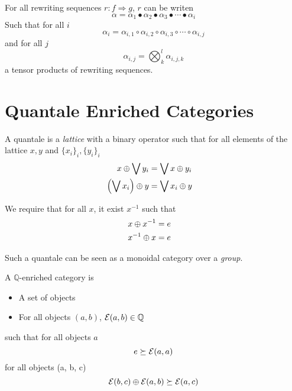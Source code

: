 \documentclass[a4paper]{article}
\begin{document}
\begin{corollary}
For all rewriting sequences $r: f \Rightarrow g$, $r$ can be writen
\[
\alpha = \alpha_1 \bullet \alpha_2 \bullet \alpha_3 \bullet \cdots \bullet
  \alpha_i
\]
Such that for all $i$
\[
\alpha_i = \alpha_{i, 1} \circ \alpha_{i, 2} \circ \alpha_{i, 3} \circ \cdots
  \circ \alpha_{i, j}
\]
and for all $j$
\[
\alpha_{i, j} = \bigotimes_k^l \alpha_{i, j, k}
\]
a tensor products of rewriting sequences.
\end{corollary}

\section{Quantale Enriched Categories}
\label{sec:quant-enrich-categ}


\begin{definition}
A quantale is a \emph{lattice} with a binary operator such that for all
  elements of the lattice $x, y$ and $\{x_i\}_i, \{y_i\}_i$
\begin{align}
x \oplus \bigvee y_i &= \bigvee x \oplus y_i \cr
\left(\bigvee x_i\right) \oplus y &= \bigvee x_i \oplus y
\end{align}

We require that for all $x$, it exist $x^{-1}$ such that
\begin{align}
x \oplus x^{-1} &= e \cr
x^{-1} \oplus x &= e
\end{align}

Such a quantale can be seen as a monoidal category over a \emph{group}.
\end{definition}

\begin{definition}
A $\mathbb{Q}$-enriched category \catE is

\begin{itemize}
\item A set of objects
\item For all objects $(a, b)$, ${\cal E}(a, b) \in \mathbb{Q}$
\end{itemize}

such that for all objects $a$
\[
e \succeq {\cal E}(a, a)
\]
for all objects (a, b, c)
\[
{\cal E}(b, c) \oplus {\cal E}(a, b) \succeq {\cal E}(a, c)
\]
\end{definition}
\end{document}
